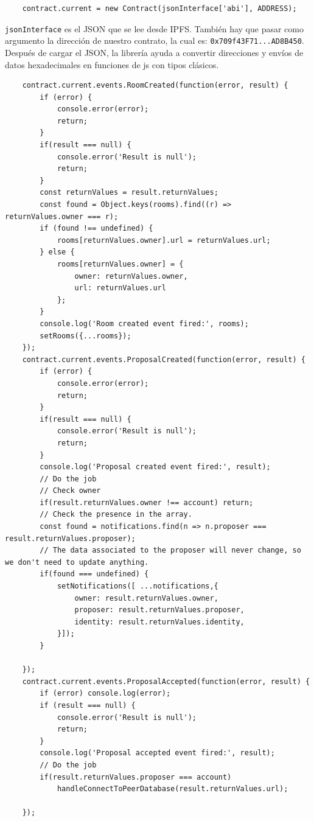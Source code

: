 \begin{lstlisting}
    contract.current = new Contract(jsonInterface['abi'], ADDRESS);
\end{lstlisting}
\verb|jsonInterface| es el JSON que se lee desde IPFS. También hay que pasar como argumento la dirección de nuestro contrato, la cual es: \verb|0x709f43F71...AD8B450|.
Después de cargar el JSON, la librería ayuda a convertir direcciones y envíos de datos hexadecimales en funciones de js con tipos clásicos.
\begin{lstlisting}
    contract.current.events.RoomCreated(function(error, result) {
        if (error) {
            console.error(error);
            return;
        }
        if(result === null) {
            console.error('Result is null');
            return;
        }
        const returnValues = result.returnValues;
        const found = Object.keys(rooms).find((r) => returnValues.owner === r);
        if (found !== undefined) {
            rooms[returnValues.owner].url = returnValues.url;
        } else {
            rooms[returnValues.owner] = {
                owner: returnValues.owner,
                url: returnValues.url
            };
        }
        console.log('Room created event fired:', rooms);
        setRooms({...rooms});
    });
    contract.current.events.ProposalCreated(function(error, result) {
        if (error) {
            console.error(error);
            return;
        }
        if(result === null) {
            console.error('Result is null');
            return;
        }
        console.log('Proposal created event fired:', result);
        // Do the job
        // Check owner
        if(result.returnValues.owner !== account) return;
        // Check the presence in the array.
        const found = notifications.find(n => n.proposer === result.returnValues.proposer);
        // The data associated to the proposer will never change, so we don't need to update anything.
        if(found === undefined) {
            setNotifications([ ...notifications,{
                owner: result.returnValues.owner,
                proposer: result.returnValues.proposer,
                identity: result.returnValues.identity,
            }]);
        }
        
    });
    contract.current.events.ProposalAccepted(function(error, result) {
        if (error) console.log(error);
        if (result === null) {
            console.error('Result is null');
            return;
        }
        console.log('Proposal accepted event fired:', result);
        // Do the job
        if(result.returnValues.proposer === account) 
            handleConnectToPeerDatabase(result.returnValues.url);

    });
\end{lstlisting}
